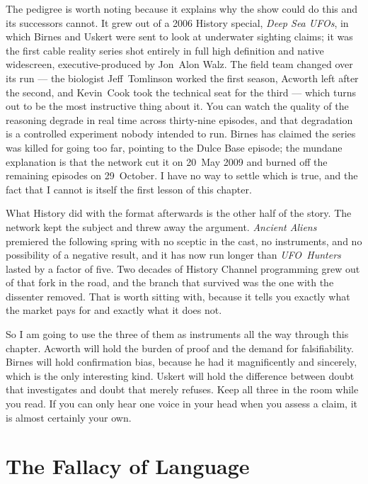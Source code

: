 The pedigree is worth noting because it explains why the show could do this and its successors
cannot. It grew out of a 2006 History special, \emph{Deep Sea UFOs}, in which Birnes and Uskert
were sent to look at underwater sighting claims; it was the first cable reality series shot
entirely in full high definition and native widescreen, executive-produced by Jon~Alon Walz. The
field team changed over its run --- the biologist Jeff~Tomlinson worked the first season,
Acworth left after the second, and Kevin~Cook took the technical seat for the third --- which
turns out to be the most instructive thing about it.  You can watch the quality of the reasoning
degrade in real time across thirty-nine episodes, and that degradation is a controlled experiment
nobody intended to run. Birnes has claimed the series was killed for going too far, pointing to
the Dulce Base episode; the mundane explanation is that the network cut it on 20~May 2009 and
burned off the remaining episodes on 29~October. I have no way to settle which is true, and the
fact that I cannot is itself the first lesson of this chapter.

What History did with the format afterwards is the other half of the story. The network kept the
subject and threw away the argument. \emph{Ancient Aliens} premiered the following spring with no
sceptic in the cast, no instruments, and no possibility of a negative result, and it has now run
longer than \emph{UFO~Hunters} lasted by a factor of five. Two decades of History Channel
programming grew out of that fork in the road, and the branch that survived was the one with the
dissenter removed. That is worth sitting with, because it tells you exactly what the market pays
for and exactly what it does not.

So I am going to use the three of them as instruments all the way through this chapter. Acworth
will hold the burden of proof and the demand for falsifiability. Birnes will hold confirmation
bias, because he had it magnificently and sincerely, which is the only interesting kind. Uskert
will hold the difference between doubt that investigates and doubt that merely refuses. Keep all
three in the room while you read. If you can only hear one voice in your head when you assess a
claim, it is almost certainly your own.

\section{The Fallacy of Language}\label{sec:fallacylanguage}

